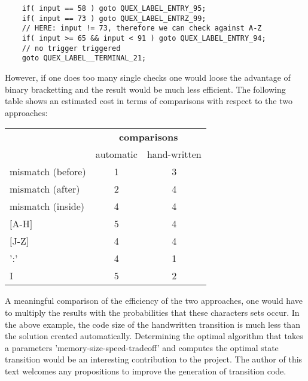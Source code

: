 \begin{lstlisting}
    if( input == 58 ) goto QUEX_LABEL_ENTRY_95;
    if( input == 73 ) goto QUEX_LABEL_ENTRZ_99;
    // HERE: input != 73, therefore we can check against A-Z
    if( input >= 65 && input < 91 ) goto QUEX_LABEL_ENTRY_94;
    // no trigger triggered 
    goto QUEX_LABEL__TERMINAL_21;
\end{lstlisting}

However, if one does too many single checks one would loose the advantage of
binary bracketting and the result would be much less efficient. The following
table shows an estimated cost in terms of comparisons with respect to the two
approaches:

\begin{center}
\begin{tabular}{l|c|c}
                         & \multicolumn{2}{c}{\bf comparisons} \\
                         & automatic & hand-written \\ \hline
    mismatch (before)    & 1 &  3 \\
    mismatch (after)     & 2 &  4 \\
    mismatch (inside)    & 4 &  4 \\	
    $[$A-H$]$            & 5 &  4 \\
    $[$J-Z$]$            & 4 &  4 \\
    ':'                  & 4 &  1 \\
    I                    & 5 &  2 \\  \hline \hline
\end{tabular}
\end{center}

A meaningful comparison of the efficiency of the two approaches, one would have
to multiply the results with the probabilities that these characters sets
occur. In the above example, the code size of the handwritten transition is
much less than the solution created automatically. Determining the optimal
algorithm that takes a parameters 'memory-size-speed-tradeoff' and computes the
optimal state transition would be an interesting contribution to the \quex
project. The author of this text welcomes any propositions to improve the
generation of transition code.  

